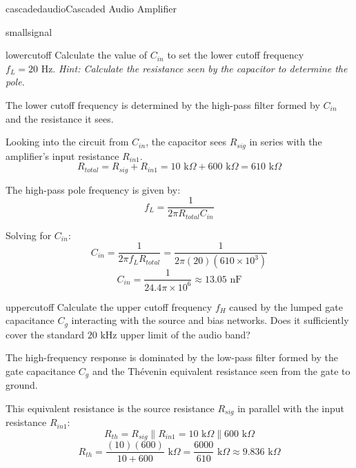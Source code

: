 \begin{mainquestion}{cascadedaudio}{Cascaded Audio Amplifier}
\begin{partquestion}{smallsignal}

\end{partquestion}

\begin{partquestion}{lowercutoff}
{Calculate the value of $C_{in}$ to set the lower cutoff frequency $f_L = 20\text{ Hz}$. \textit{Hint: Calculate the resistance seen by the capacitor to determine the pole.}}

\begin{answer}[3.5in]
        The lower cutoff frequency is determined by the high-pass filter formed by $C_{in}$ and the resistance it sees. 
        
        Looking into the circuit from $C_{in}$, the capacitor sees $R_{sig}$ in series with the amplifier's input resistance $R_{in1}$.
        \[R_{total} = R_{sig} + R_{in1} = 10\text{ k}\Omega + 600\text{ k}\Omega = 610\text{ k}\Omega\]
        
        The high-pass pole frequency is given by:
        \[f_L = \frac{1}{2\pi R_{total} C_{in}}\]
        
        Solving for $C_{in}$:
        \[C_{in} = \frac{1}{2\pi f_L R_{total}} = \frac{1}{2\pi (20)(610 \times 10^3)}\]
        \[C_{in} = \frac{1}{24.4 \pi \times 10^6} \approx 13.05\text{ nF}\]
\end{answer}

\end{partquestion}

\begin{partquestion}{uppercutoff}
{Calculate the upper cutoff frequency $f_H$ caused by the lumped gate capacitance $C_g$ interacting with the source and bias networks. Does it sufficiently cover the standard $20\text{ kHz}$ upper limit of the audio band?}

\begin{answer}[3.5in]
        The high-frequency response is dominated by the low-pass filter formed by the gate capacitance $C_g$ and the Thévenin equivalent resistance seen from the gate to ground.
        
        This equivalent resistance is the source resistance $R_{sig}$ in parallel with the input resistance $R_{in1}$:
        \[R_{th} = R_{sig} \parallel R_{in1} = 10\text{ k}\Omega \parallel 600\text{ k}\Omega\]
        \[R_{th} = \frac{(10)(600)}{10 + 600}\text{ k}\Omega = \frac{6000}{610}\text{ k}\Omega \approx 9.836\text{ k}\Omega\]
        

\end{answer}
\end{partquestion}
\end{mainquestion}
